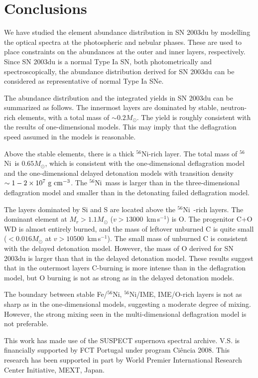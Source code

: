 \documentclass[usegraphicx,usenatbib]{mn2e}
\newcommand{\kms}{\mbox{\,km\,s$^{-1}$}}
\newcommand{\Msun}{M_{\odot}}
\newcommand{\Nifs}{$^{56}$Ni}
\begin{document}
\section{Conclusions}
\label{sec:con}

We have studied the element abundance distribution in SN 2003du by modelling
the optical spectra at the photospheric and nebular phases. These are used to
place constraints on the abundances at the outer and inner layers, respectively.
Since SN 2003du is a normal Type Ia SN, both photometrically and
spectroscopically, the abundance distribution derived for SN 2003du can be
considered as representative of normal Type Ia SNe.

The abundance distribution and the integrated yields in SN 2003du can be
summarized as follows. The innermost layers are dominated by stable,
neutron-rich elements, with a total mass of $\sim 0.2 \Msun$. The yield is
roughly consistent with the results of one-dimensional models.  This may imply
that the deflagration speed assumed in the models is reasonable.

Above the stable elements, there is a thick \Nifs-rich layer. The total mass of
\Nifs\ is $0.65 \Msun$, which is consistent  with the one-dimensional
deflagration model and the one-dimensional delayed detonation models  with
transition density $\sim 1-2 \times 10^7 \ {\rm g\ cm^{-3}}$. The \Nifs\ mass is
larger than in the three-dimensional deflagration model and smaller than in the
detonating failed deflagration model. 

The layers dominated by Si and S are located above the \Nifs\ -rich layers.
The dominant element at $M_r > 1.1\Msun$ ($v > 13000$ \kms) is O. The
progenitor C+O WD is almost entirely burned, and the mass of leftover unburned C
is quite small ($< 0.016 \Msun$ at $v>10500$ \kms). The small mass of unburned C
is consistent with the delayed detonation model. However, the mass of O derived
for SN 2003du is larger than that in the delayed detonation model. These results
suggest that in the outermost layers C-burning is more intense than in the
deflagration model, but O burning is not as strong as in the delayed detonation
models.

The boundary between stable Fe/\Nifs,
\Nifs/IME, IME/O-rich layers is not as sharp as in the one-dimensional models,
suggesting a moderate degree of mixing. However, the strong mixing seen in the
multi-dimensional deflagration model is not preferable.



\vspace{3mm}
\noindent
This work has made use of the SUSPECT supernova spectral archive.
V.S. is financially supported by FCT Portugal under 
program Ci\^{e}ncia 2008.
This research has been supported in part by World Premier
International Research Center Initiative, MEXT, Japan.
\end{document}
